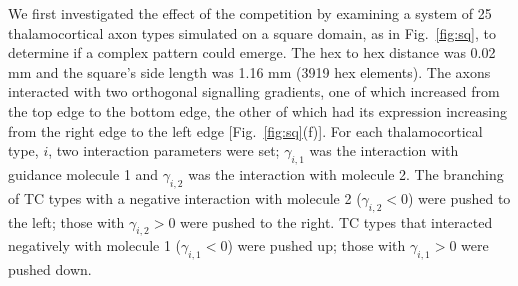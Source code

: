 \documentclass[a4paper,11pt]{article}
\begin{document}
We first investigated the effect of the competition by examining a system of
25 thalamocortical axon types simulated on a square domain, as in
Fig.~\ref{fig:sq}, to determine if a complex pattern could emerge. The hex
to hex distance was 0.02 mm and the square's side length was 1.16 mm (3919 hex
elements). The axons interacted with two orthogonal signalling gradients, one
of which increased from the top edge to the bottom edge, the other of which
had its expression increasing from the right edge to the left edge
[Fig.~\ref{fig:sq}(f)]. For each thalamocortical type, $i$, two
interaction parameters were set; $\gamma_{i,1}$ was the interaction with
guidance molecule 1 and $\gamma_{i,2}$ was the interaction with molecule
2. The branching of TC types with a negative interaction with molecule 2
($\gamma_{i,2}<0$) were pushed to the left; those with $\gamma_{i,2}>0$ were
pushed to the right. TC types that interacted negatively with molecule 1
($\gamma_{i,1}<0$) were pushed up; those with $\gamma_{i,1}>0$ were pushed
down.
\end{document}
